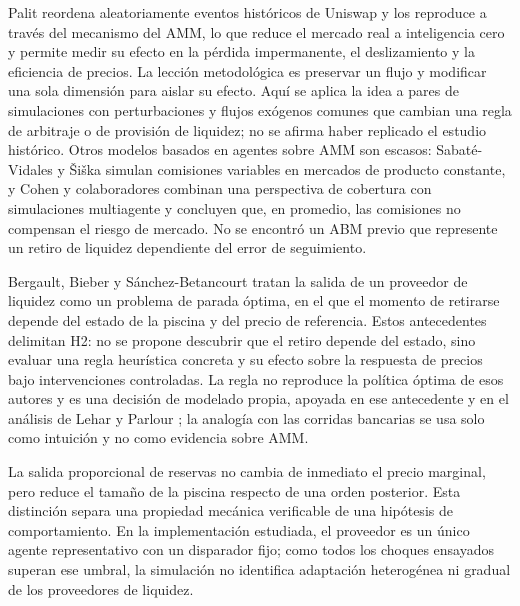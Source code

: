 Palit \cite{palit2022shuffled} reordena aleatoriamente eventos históricos de Uniswap y los reproduce a través del mecanismo del AMM, lo que reduce el mercado real a inteligencia cero y permite medir su efecto en la pérdida impermanente, el deslizamiento y la eficiencia de precios. La lección metodológica es preservar un flujo y modificar una sola dimensión para aislar su efecto. Aquí se aplica la idea a pares de simulaciones con perturbaciones y flujos exógenos comunes que cambian una regla de arbitraje o de provisión de liquidez; no se afirma haber replicado el estudio histórico. Otros modelos basados en agentes sobre AMM son escasos: Sabaté-Vidales y Šiška \cite{sabatevidales2023variable} simulan comisiones variables en mercados de producto constante, y Cohen y colaboradores \cite{cohen2023inefficiency} combinan una perspectiva de cobertura con simulaciones multiagente y concluyen que, en promedio, las comisiones no compensan el riesgo de mercado. No se encontró un ABM previo que represente un retiro de liquidez dependiente del error de seguimiento.

Bergault, Bieber y Sánchez-Betancourt \cite{bergault2025exit} tratan la salida de un proveedor de liquidez como un problema de parada óptima, en el que el momento de retirarse depende del estado de la piscina y del precio de referencia. Estos antecedentes delimitan H2: no se propone descubrir que el retiro depende del estado, sino evaluar una regla heurística concreta y su efecto sobre la respuesta de precios bajo intervenciones controladas. La regla no reproduce la política óptima de esos autores y es una decisión de modelado propia, apoyada en ese antecedente y en el análisis de Lehar y Parlour \cite{lehar2025uniswap}; la analogía con las corridas bancarias \cite{diamond1983bank} se usa solo como intuición y no como evidencia sobre AMM.

La salida proporcional de reservas no cambia de inmediato el precio marginal, pero reduce el tamaño de la piscina respecto de una orden posterior. Esta distinción separa una propiedad mecánica verificable de una hipótesis de comportamiento. En la implementación estudiada, el proveedor es un único agente representativo con un disparador fijo; como todos los choques ensayados superan ese umbral, la simulación no identifica adaptación heterogénea ni gradual de los proveedores de liquidez.

